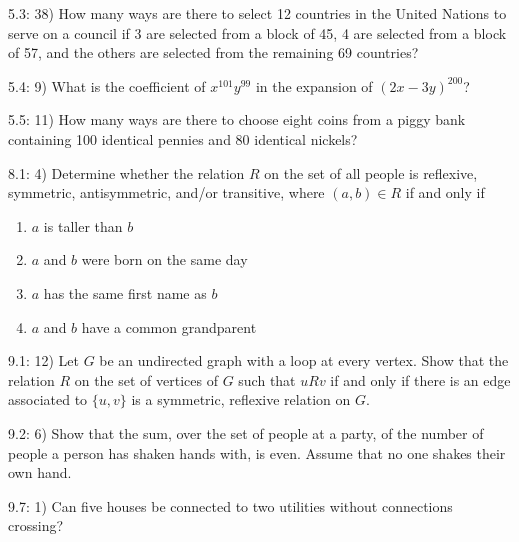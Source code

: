 \documentclass{article}
\begin{document}
5.3: 38) How many ways are there to select 12 countries in the United
Nations to serve on a council if 3 are selected from a block of 45, 4
are selected from a block of 57, and the others are selected from the
remaining 69 countries?

5.4: 9) What is the coefficient of $x^{101}y^{99}$ in the expansion of
$(2x-3y)^{200}$?

5.5: 11) How many ways are there to choose eight coins from a piggy
bank containing 100 identical pennies and 80 identical nickels?

8.1: 4) Determine whether the relation $R$ on the set of all people is reflexive, symmetric, antisymmetric, and/or transitive, where $(a,b) \in R$ if and only if

\begin{enumerate}[label=\alph{enumi})]
\item $a$ is taller than $b$
\item $a$ and $b$ were born on the same day
\item $a$ has the same first name as $b$
\item $a$ and $b$ have a common grandparent
\end{enumerate}

9.1: 12) Let $G$ be an undirected graph with a loop at every vertex.  Show that the relation $R$ on the set of vertices of $G$ such that $uRv$ if and only if there is an edge associated to $\{u,v\}$ is a symmetric, reflexive relation on $G$.

9.2: 6) Show that the sum, over the set of people at a party, of the number of people a person has shaken hands with, is even.  Assume that no one shakes their own hand.

9.7: 1) Can five houses be connected to two utilities without connections crossing?
\end{document}
